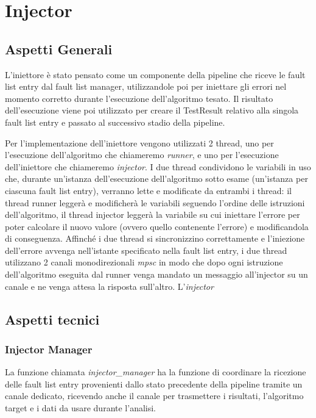 \section{Injector}\label{sec: Injector}
\subsection{Aspetti Generali}
L'iniettore è stato pensato come un componente della pipeline che riceve le fault list entry dal fault list manager, utilizzandole poi per iniettare gli errori nel momento 
corretto durante l'esecuzione dell'algoritmo tesato. Il risultato dell'esecuzione viene poi utilizzato per creare il TestResult relativo alla singola fault list entry e passato 
al successivo stadio della pipeline. 

Per l'implementazione dell'iniettore vengono utilizzati 2 thread, uno per l'esecuzione dell'algoritmo che chiameremo \textit{runner}, e uno per l'esecuzione dell'i\-niettore che 
chiameremo \textit{injector}. I due thread condividono le variabili in uso che, durante un'istanza dell'esecuzione dell'algoritmo sotto esame (un'istanza per ciascuna fault list 
entry), verranno lette e modificate da entrambi i thread: il thread runner leggerà e modificherà le variabili seguendo l'ordine delle istruzioni dell'algoritmo, il thread
injector leggerà la variabile su cui iniettare l'errore per poter calcolare il nuovo valore (ovvero quello contenente l'errore) e modificandola di conseguenza. Affinché i due 
thread si sincronizzino correttamente e l'iniezione dell'errore avvenga nell'istante specificato nella fault list entry, i due thread utilizzano 2 canali monodirezionali \textit{mpsc} in modo che 
dopo ogni istruzione dell'algoritmo eseguita dal runner venga mandato un messaggio all'injector su un canale e ne venga attesa la risposta sull'altro. L'\textit{injector}

\subsection{Aspetti tecnici}
\subsubsection{Injector Manager}
La funzione chiamata \textit{injector\_manager} ha la funzione di coordinare la ricezione delle fault list entry provenienti dallo stato precedente della pipeline tramite un canale dedicato, ricevendo anche il canale per trasmettere i risultati, l'algoritmo target e i dati da usare durante l'analisi.


